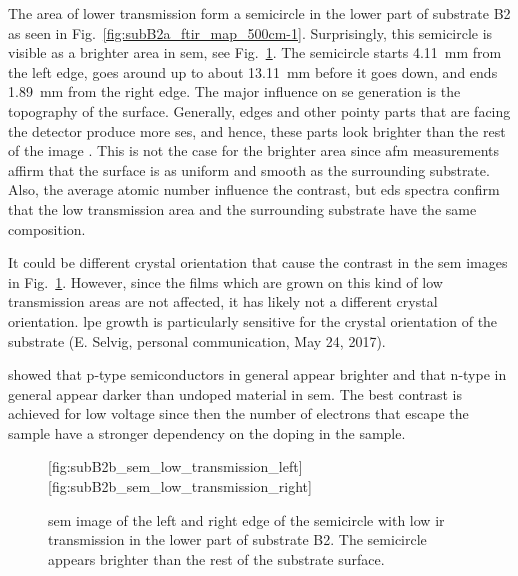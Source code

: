 The area of lower transmission form a semicircle in the lower part of substrate B2 as seen in Fig.~\ref{fig:subB2a_ftir_map_500cm-1}. Surprisingly, this semicircle is visible as a brighter area in \ac{sem}, see Fig.~\ref{fig:subB2b_sem_low_transmission}. The semicircle starts \SI{4.11}{\milli\metre} from the left edge, goes around up to about \SI{13.11}{\milli\metre} before it goes down, and ends \SI{1.89}{\milli\metre} from the right edge. The major influence on \ac{se} generation is the topography of the surface. Generally, edges and other pointy parts that are facing the detector produce more \acp{se}, and hence, these parts look brighter than the rest of the image \citep{goldstein2012scanning}. This is not the case for the brighter area since \ac{afm} measurements affirm that the surface is as uniform and smooth as the surrounding substrate. Also, the average atomic number influence the contrast, but \ac{eds} spectra confirm that the low transmission area and the surrounding substrate have the same composition.

It could be different crystal orientation that cause the contrast in the \ac{sem} images in Fig.~\ref{fig:subB2b_sem_low_transmission}. However, since the films which are grown on this kind of low transmission areas are not affected, it has likely not a different crystal orientation. \Ac{lpe} growth is particularly sensitive for the crystal orientation of the substrate (E. Selvig, personal communication, May 24, 2017).

\citet{sealy2000mechanism} showed that p-type semiconductors in general appear brighter and that n-type in general appear darker than undoped material in \ac{sem}. The best contrast is achieved for low voltage since then the number of electrons that escape the sample have a stronger dependency on the doping in the sample. 

\begin{figure}
    \centering
    [fig:subB2b_sem_low_transmission_left]
    \hfill
    [fig:subB2b_sem_low_transmission_right]
    \caption[\Ac{sem} image of the semicircle with low \ac{ir} transmission on substrate B2.]{\Ac{sem} image of the  left and  right edge of the semicircle with low \ac{ir} transmission in the lower part of substrate B2. The semicircle appears brighter than the rest of the substrate surface.}\label{fig:subB2b_sem_low_transmission}
\end{figure}

